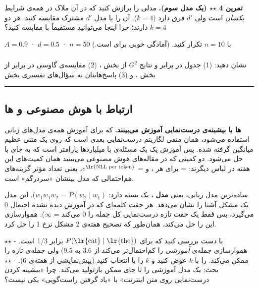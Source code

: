 \textbf{تمرین 4 \ensuremath{\star}\ensuremath{\star} (یک مدل  سوم).} مدلی را برازش کنید که در آن
ملاک در همه‌ی شرایط \emph{یکسان} است ولی \(d'\) فرق دارد (\(k = 4\)).
 آن را با مدل \(d'\) مشترک مقایسه کنید. هر دو \(k = 4\) دارند؛
چرا اینجا می‌توانید مستقیماً با  مقایسه کنید؟

\(A = 0.9\) · \(d = 0.5\) · \(n = 50\) با \(n = 10\) تکرار کنید. (آمادگی
خوبی برای  است.)

\subsubsection{\texorpdfstring{}{lab check-off}}

نشان دهید: (1) جدول  در برابر  و نتایج \(G^2\) از بخش
، (2) مقایسه‌ی گاوسی در برابر  از بخش ، و (3)
پاسخ‌هایتان به سؤال‌های تفسیری بخش 

\begin{center}\rule{0.5\linewidth}{0.5pt}\end{center}

\subsection{\texorpdfstring{ارتباط با هوش مصنوعی و
ها}{ارتباط با هوش مصنوعی و LLMها}}

\textbf{ها با بیشینه‌ی درست‌نمایی آموزش می‌بینند.}
 که برای آموزش همه‌ی مدل‌های زبانی استفاده می‌شود،
همان منفی لگاریتم درست‌نمایی  بعدی است که روی یک 
متنی عظیم میانگین گرفته شده. پس آموزش یک  یک مسئله‌ی  با
میلیاردها پارامتر است که به جای  با  حل می‌شود. دو کمیتی که در مقاله‌های هوش مصنوعی می‌بینید همان
کمیت‌های این هفته در لباس دیگرند: \textbf{} =  برای هر
، و \textbf{} = \(e^{\text{\lr{NLL per token}}}\)،
یعنی تعداد مؤثر گزینه‌های هم‌احتمالی که مدل بینشان «سردرگم» است.

ساده‌ترین مدل زبانی، یعنی \textbf{مدل }، یک  بسته
دارد: \(P(w_2\mid w_1)\) = \(w_1 w_2\)\(w_1\)).
این مدل یک مشکل آشنا را نشان می‌دهد. هر جفت کلمه‌ای که در آموزش دیده نشده
احتمال 0 می‌گیرد، پس فقط یک جفت تازه درست‌نمایی کل جمله را 0 می‌کند
 = \ensuremath{\infty}). هموارسازی  این را حل می‌کند، همان‌طور که
تصحیح  هفته‌ی 2 مشکل نرخ  1 را حل کرد.

با دست بررسی کنید که  برای \(P(\text{\lr{cat}}\mid\text{\lr{the}})\) برابر
1/3 است. - \ensuremath{\star}\ensuremath{\star} هموارسازی جمله‌ی \emph{آموزشی} را کم‌احتمال‌تر می‌کند
 از 3.6 به 9.5) ولی جمله‌ی تازه را ممکن می‌کند.  را
با \(k\) عوض کنید و \(k\) را با  انتخاب کنید (پیش‌نمایشی از هفته‌ی 6). - \ensuremath{\star}\ensuremath{\star} بحث:
 یک مدل  آموزشی را تا جای ممکن بازتولید می‌کند.
چرا «بیشینه کردن درست‌نمایی روی متن اینترنت» با «یاد گرفتن راست‌گویی» یکی
نیست؟

